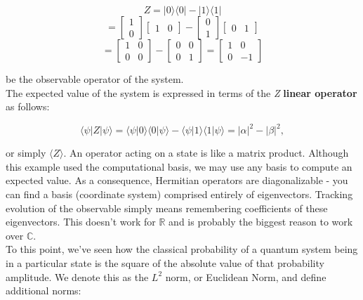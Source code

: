 \documentclass[letterpaper, 10 pt, conference]{ieeeconf}
\begin{document}
\[
Z = |0\rangle\langle0| - |1\rangle\langle1|
\]
\[
=
\begin{bmatrix} 1 \\ 0 \end{bmatrix}
\begin{bmatrix} 1 & 0 \end{bmatrix} -
\begin{bmatrix} 0 \\ 1 \end{bmatrix}
\begin{bmatrix} 0 & 1 \end{bmatrix}
\]
\[
=
\begin{bmatrix}
1 & 0 \\
0 & 0
\end{bmatrix} -
\begin{bmatrix}
0 & 0 \\
0 & 1
\end{bmatrix} =
\begin{bmatrix}
1 & 0 \\
0 & -1
\end{bmatrix}
\]

be the observable operator of the system.\\

The expected value of the system is expressed in terms of the \textit{Z} \textbf{linear operator} as follows:

\begin{equation}
\langle\psi|Z|\psi\rangle = \langle\psi|0\rangle \langle0|\psi\rangle - \langle\psi|1\rangle \langle1|\psi\rangle = |\alpha|^2 - |\beta|^2,
\end{equation}

or simply \( \langle Z \rangle \).  An operator acting on a state is like a matrix product.  Although this example used the computational basis, we may use any basis to compute an expected value.  As a consequence, Hermitian operators are diagonalizable - you can find a basis (coordinate system) comprised entirely of eigenvectors.  Tracking evolution of the observable simply means remembering coefficients of these eigenvectors.  This doesn't work for \( \mathbb{R} \) and is probably the biggest reason to work over \( \mathbb{C} \). \\

To this point, we've seen how the classical probability of a quantum system being in a particular state is the square of the absolute value of that probability amplitude.  We denote this as the \( L^2 \) norm, or Euclidean Norm, and define additional norms:
\end{document}
